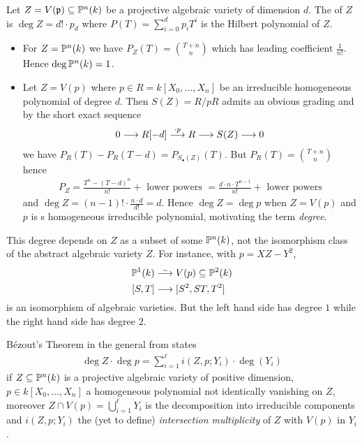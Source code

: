 \documentclass[a4paper,parskip=half,numbers=enddot, DIV=12]{scrreprt}
\begin{document}
\begin{defi}
    Let $Z= V(\mathfrak{p}) \subseteq \mathbb{P}^n(k)$ be a projective algebraic variety of dimension $d$. The  of $Z$ is $\deg Z=d!\cdot p_d$ where $P(T) = \sum_{i=0}^d p_i T^i$ is the Hilbert polynomial of $Z$.
\end{defi}
\begin{example}
    \begin{itemize}
      \item 
        For $Z=\mathbb{P}^n(k)$ we have $P_Z(T) = \binom{T+n}n$ which has leading coefficient $\frac{1}{n!}$. Hence $\deg \mathbb{P}^n(k) = 1$.
    \item 
        Let $Z= V(p)$ where $p\in R = k[X_0,\ldots, X_n]$ be an irreducible homogeneous polynomial of degree $d$. Then $S(Z) = R/pR$ admits an obvious grading and by the short exact sequence
        \begin{align*}
            0\morphism R[-d]\morphism[\cdot p] R\morphism S (Z) \morphism 0
        \end{align*}
        we have $P_R(T) - P_R(T-d) = P_{S_\bullet(Z)}(T)$. But $P_R(T) = \binom{T+n}n$ hence 
        \begin{align*}
        	P_Z = \frac{T^n-(T-d)^n}{n!} + \text{ lower powers } = \frac{d\cdot n\cdot T^{n-1}}{n!} + \text{ lower powers} 
        \end{align*}
        and $\deg Z = (n-1)! \cdot\frac{n\cdot d}{d!} = d$. Hence $\deg Z = \deg p$ when $Z=V(p)$ and $p$ is s homogeneous irreducible polynomial, motivating the term \emph{degree}.
    \end{itemize}
\end{example}
\begin{rem*}
    This degree depends on $Z$ as a subset of some $\mathbb{P}^n(k)$, not the isomorphism class of the abstract algebraic variety $Z$. For instance, with $p= XZ-Y^2$,
    \begin{align*}
        \IP^1(k) &\isomorphism  V(p) \subseteq \IP^2(k)\\
        [S,T] &\morphism[] [S^2, ST, T^2]
    \end{align*}
    is an isomorphism of algebraic varieties. But the left hand side has degree $1$ while the right hand side has degree $2$.
\end{rem*}
\begin{rem*}
    B\'ezout's Theorem in the general from states 
    \begin{align*}
    	\deg Z\cdot \deg p = \sum_{i=1}^\ell i(Z,p; Y_i) \cdot \deg(Y_i)
    \end{align*}
     if $Z\subseteq \mathbb{P}^n(k)$ is a projective algebraic variety of positive dimension, $p\in k[X_0,\ldots, X_n]$ a homogeneous polynomial not identically vanishing on $Z$, moreover $Z\cap V(p) = \bigcup_{i=1}^\ell Y_i$ is the decomposition into irreducible components and $i(Z,p;Y_i)$ the (yet to define) \emph{intersection multiplicity} of $Z$ with $V(p)$ in $Y_i$.
\end{rem*}
\end{document}
